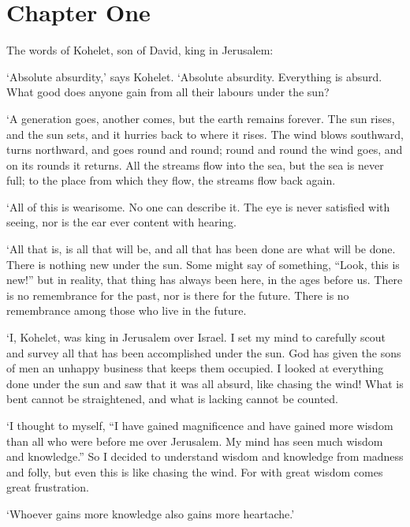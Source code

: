 \chapter*{Chapter One}

The words of Kohelet, son of David, king in Jerusalem:

`Absolute absurdity,' says Kohelet. `Absolute absurdity. Everything is absurd. What good does anyone gain from all their labours under the sun? 

`A generation goes, another comes, but the earth remains forever. The sun rises, and the sun sets, and it hurries back to where it rises. The wind blows southward, turns northward, and goes round and round; round and round the wind goes, and on its rounds it returns. All the streams flow into the sea, but the sea is never full; to the place from which they flow, the streams flow back again.

`All of this is wearisome. No one can describe it. The eye is never satisfied with seeing, nor is the ear ever content with hearing.

`All that is, is all that will be, and all that has been done are what will be done. There is nothing new under the sun. Some might say of something, ``Look, this is new!'' but in reality, that thing has always been here, in the ages before us. There is no remembrance for the past, nor is there for the future. There is no remembrance among those who live in the future.

`I, Kohelet, was king in Jerusalem over Israel. I set my mind to carefully scout and survey all that has been accomplished under the sun. God has given the sons of men an unhappy business that keeps them occupied. I looked at everything done under the sun and saw that it was all absurd, like chasing the wind! What is bent cannot be straightened, and what is lacking cannot be counted.

`I thought to myself, “I have gained magnificence and have gained more wisdom than all who were before me over Jerusalem. My mind has seen much wisdom and knowledge.” So I decided to understand wisdom and knowledge from madness and folly, but even this is like chasing the wind. For with great wisdom comes great frustration.

`Whoever gains more knowledge also gains more heartache.'
